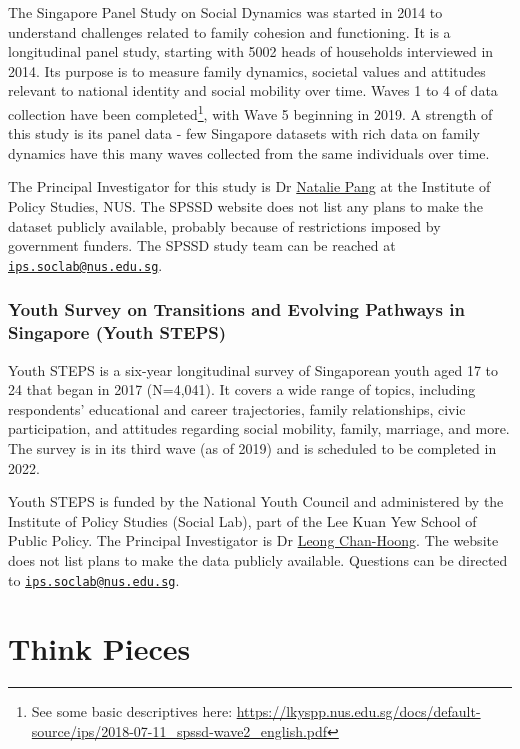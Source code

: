 \documentclass[openany]{book}
\let\rmarkdownfootnote\footnote%
\def\footnote{\protect\rmarkdownfootnote}
\begin{document}
The Singapore Panel Study on Social Dynamics was started in 2014 to
understand challenges related to family cohesion and functioning. It is
a longitudinal panel study, starting with 5002 heads of households
interviewed in 2014. Its purpose is to measure family dynamics, societal
values and attitudes relevant to national identity and social mobility
over time. Waves 1 to 4 of data collection have been completed\footnote{See
  some basic descriptives here:
  \url{https://lkyspp.nus.edu.sg/docs/default-source/ips/2018-07-11_spssd-wave2_english.pdf}},
with Wave 5 beginning in 2019. A strength of this study is its panel
data - few Singapore datasets with rich data on family dynamics have
this many waves collected from the same individuals over time.

The Principal Investigator for this study is Dr
\href{https://lkyspp.nus.edu.sg/our-people/faculty/natalie-pang}{Natalie
Pang} at the Institute of Policy Studies, NUS. The SPSSD website does
not list any plans to make the dataset publicly available, probably
because of restrictions imposed by government funders. The SPSSD study
team can be reached at
\href{mailto:ips.soclab@nus.edu.sg}{\nolinkurl{ips.soclab@nus.edu.sg}}.

\section{Youth Survey on Transitions and Evolving Pathways in Singapore
(Youth
STEPS)}\label{youth-survey-on-transitions-and-evolving-pathways-in-singapore-youth-steps}

Youth STEPS is a six-year longitudinal survey of Singaporean youth aged
17 to 24 that began in 2017 (N=4,041). It covers a wide range of topics,
including respondents' educational and career trajectories, family
relationships, civic participation, and attitudes regarding social
mobility, family, marriage, and more. The survey is in its third wave
(as of 2019) and is scheduled to be completed in 2022.

Youth STEPS is funded by the National Youth Council and administered by
the Institute of Policy Studies (Social Lab), part of the Lee Kuan Yew
School of Public Policy. The Principal Investigator is Dr
\href{http://lkyspp.splashinteractive.sg/ips/about-us/staff-directory/leong-chan-hoong}{Leong
Chan-Hoong}. The website does not list plans to make the data publicly
available. Questions can be directed to
\href{mailto:ips.soclab@nus.edu.sg}{\nolinkurl{ips.soclab@nus.edu.sg}}.

\part{Think Pieces}\label{part-think-pieces}
\end{document}
